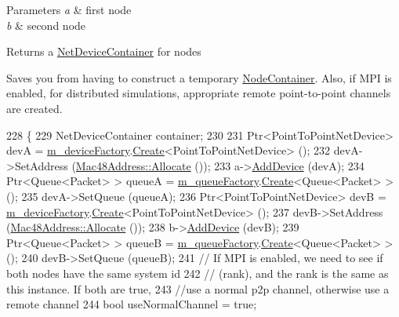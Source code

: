\begin{DoxyParams}{Parameters}
{\em a} & first node \\
\hline
{\em b} & second node \\
\hline
\end{DoxyParams}
\begin{DoxyReturn}{Returns}
a \hyperlink{classns3_1_1NetDeviceContainer}{Net\+Device\+Container} for nodes
\end{DoxyReturn}
Saves you from having to construct a temporary \hyperlink{classns3_1_1NodeContainer}{Node\+Container}. Also, if M\+PI is enabled, for distributed simulations, appropriate remote point-\/to-\/point channels are created. 
\begin{DoxyCode}
228 \{
229   NetDeviceContainer container;
230 
231   Ptr<PointToPointNetDevice> devA = \hyperlink{classns3_1_1PointToPointHelper_ab70d3d643f30b809c90530d494a73eb4}{m\_deviceFactory}.\hyperlink{classns3_1_1ObjectFactory_a18152e93f0a6fe184ed7300cb31e9896}{Create}<PointToPointNetDevice> ();
232   devA->SetAddress (\hyperlink{classns3_1_1Mac48Address_a203b53c035649c0d4881fa1115aa2cdb}{Mac48Address::Allocate} ());
233   a->\hyperlink{classns3_1_1Node_a42ff83ee1d5d1649c770d3f5b62375de}{AddDevice} (devA);
234   Ptr<Queue<Packet> > queueA = \hyperlink{classns3_1_1PointToPointHelper_a79d2da8ad9d40adc181d4c1b8520890f}{m\_queueFactory}.\hyperlink{classns3_1_1ObjectFactory_a18152e93f0a6fe184ed7300cb31e9896}{Create}<Queue<Packet> > ();
235   devA->SetQueue (queueA);
236   Ptr<PointToPointNetDevice> devB = \hyperlink{classns3_1_1PointToPointHelper_ab70d3d643f30b809c90530d494a73eb4}{m\_deviceFactory}.\hyperlink{classns3_1_1ObjectFactory_a18152e93f0a6fe184ed7300cb31e9896}{Create}<PointToPointNetDevice> ();
237   devB->SetAddress (\hyperlink{classns3_1_1Mac48Address_a203b53c035649c0d4881fa1115aa2cdb}{Mac48Address::Allocate} ());
238   b->\hyperlink{classns3_1_1Node_a42ff83ee1d5d1649c770d3f5b62375de}{AddDevice} (devB);
239   Ptr<Queue<Packet> > queueB = \hyperlink{classns3_1_1PointToPointHelper_a79d2da8ad9d40adc181d4c1b8520890f}{m\_queueFactory}.\hyperlink{classns3_1_1ObjectFactory_a18152e93f0a6fe184ed7300cb31e9896}{Create}<Queue<Packet> > ();
240   devB->SetQueue (queueB);
241   \textcolor{comment}{// If MPI is enabled, we need to see if both nodes have the same system id }
242   \textcolor{comment}{// (rank), and the rank is the same as this instance.  If both are true, }
243   \textcolor{comment}{//use a normal p2p channel, otherwise use a remote channel}
244   \textcolor{keywordtype}{bool} useNormalChannel = \textcolor{keyword}{true};

\end{DoxyCode}
